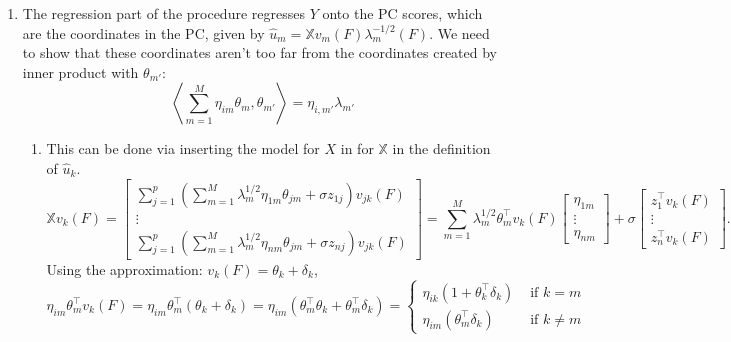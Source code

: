 \documentclass[11pt]{article}
\newcommand{\X}{\mathbb{X}}
\begin{document}
\begin{enumerate}
\item The regression part of the procedure regresses $Y$ onto the PC scores, which are the coordinates in the PC, given by $\hat{u}_m = \X v_m(F) \lambda_m^{-1/2}(F)$.  We need to show that these coordinates aren't too far from the coordinates created by inner product with $\theta_{m'}$:
\begin{equation}
\left\langle \sum_{m=1}^M \eta_{im} \theta_{m}, \theta_{m'} \right\rangle = \eta_{i,m'} \lambda_{m'}
\end{equation}
\begin{enumerate}
\item This can be done via inserting the model for $X$ in for $\X$ in the definition of $\hat{u}_k$.
\begin{equation}
\X v_k(F) 
=
\begin{bmatrix} 
\sum_{j=1}^p \left(\sum_{m=1}^M \lambda_m^{1/2}\eta_{1m} \theta_{jm} + \sigma z_{1j}\right) v_{jk}(F) \\
\vdots \\
\sum_{j=1}^p \left(\sum_{m=1}^M \lambda_m^{1/2}\eta_{nm} \theta_{jm} + \sigma z_{nj}\right)v_{jk}(F)
\end{bmatrix}
=
\sum_{m=1}^M
\lambda_m^{1/2}\theta_{m}^\top v_k(F) 
\begin{bmatrix} 
 \eta_{1m} \\
\vdots \\
 \eta_{nm} 
\end{bmatrix}
+
\sigma
\begin{bmatrix} 
z_{1}^{\top}v_{k}(F) \\
\vdots \\
 z_{n}^{\top}v_{k}(F) 
\end{bmatrix}.
\end{equation}
Using the approximation: $v_k(F) = \theta_k + \delta_k$,
\begin{equation}
\eta_{im} \theta_{m}^\top v_k(F)  = \eta_{im} \theta_{m}^\top (\theta_k + \delta_k) 
= 
\eta_{im} (\theta_{m}^\top \theta_k + \theta_{m}^\top\delta_k)
=
\begin{cases}
\eta_{ik}(1+\theta_{k}^\top\delta_k) & \textrm{ if } k = m \\
\eta_{im}(\theta_{m}^\top\delta_k) & \textrm{ if } k \neq m
\end{cases}
\end{equation}


\end{enumerate}
\end{enumerate}
\end{document}
